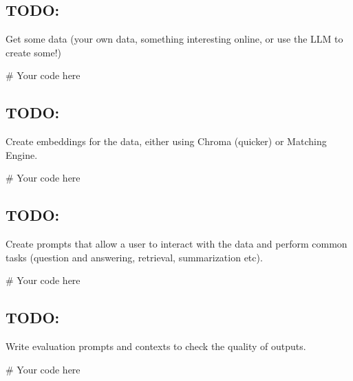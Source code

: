 \documentclass[
  letterpaper,
  DIV=11,
  numbers=noendperiod]{scrreprt}
\newenvironment{Shaded}{\begin{snugshade}}{\end{snugshade}}
\newcommand{\CommentTok}[1]{\textcolor[rgb]{0.37,0.37,0.37}{#1}}
\begin{document}
\hypertarget{todo-3}{%
\subsection{TODO:}\label{todo-3}}

Get some data (your own data, something interesting online, or use the
LLM to create some!)

\begin{Shaded}
\begin{Highlighting}[]
\CommentTok{\# Your code here}
\end{Highlighting}
\end{Shaded}

\hypertarget{todo-4}{%
\subsection{TODO:}\label{todo-4}}

Create embeddings for the data, either using Chroma (quicker) or
Matching Engine.

\begin{Shaded}
\begin{Highlighting}[]
\CommentTok{\# Your code here}
\end{Highlighting}
\end{Shaded}

\hypertarget{todo-5}{%
\subsection{TODO:}\label{todo-5}}

Create prompts that allow a user to interact with the data and perform
common tasks (question and answering, retrieval, summarization etc).

\begin{Shaded}
\begin{Highlighting}[]
\CommentTok{\# Your code here}
\end{Highlighting}
\end{Shaded}

\hypertarget{todo-6}{%
\subsection{TODO:}\label{todo-6}}

Write evaluation prompts and contexts to check the quality of outputs.

\begin{Shaded}
\begin{Highlighting}[]
\CommentTok{\# Your code here}
\end{Highlighting}
\end{Shaded}
\end{document}
